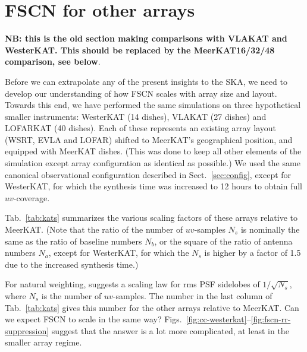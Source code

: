 \documentclass{aa}
\begin{document}
\section{FSCN for other arrays}
\label{sec:other-arrays}

{\bf NB: this is the old section making comparisons with VLAKAT and WesterKAT. This should be replaced by the MeerKAT16/32/48 comparison, see below}.

Before we can extrapolate any of the present insights to the SKA, we need to develop our understanding of how FSCN scales with array size and layout. Towards this end, we have performed the same simulations on three hypothetical smaller instruments: WesterKAT (14 dishes), VLAKAT (27 dishes) and LOFARKAT (40 dishes). Each of these represents an existing array layout (WSRT, EVLA and LOFAR) shifted to MeerKAT's geographical position, and equipped with MeerKAT dishes. (This was done to keep all other elements of the simulation except array configuration as identical as possible.) We used the same canonical observational configuration described in Sect.~\ref{sec:config}, except for WesterKAT, for which the synthesis time was increased to 12 hours to obtain full $uv$-coverage. 

Tab.~\ref{tab:kats} summarizes the various scaling factors of these arrays relative to MeerKAT. (Note that the ratio of the number of $uv$-samples $N_s$ is nominally the same as the ratio of baseline numbers $N_b$, or the square of the ratio of antenna numbers $N_a$, except for WesterKAT, for which the $N_s$ is higher by a factor of 1.5 due to the increased synthesis time.) 

For natural weighting, \citet{SKA49} suggests a scaling law for rms PSF sidelobes of $1/\sqrt{N_s}$, where $N_s$ is the number of $uv$-samples. The number in the last column of Tab.~\ref{tab:kats} gives this number for the other arrays relative to MeerKAT. Can we expect FSCN to scale in the same way? Figs.~\ref{fig:cc-westerkat}--\ref{fig:fscn-rr-suppression} suggest that the answer is a lot more complicated, at least in the smaller array regime. 
\end{document}
